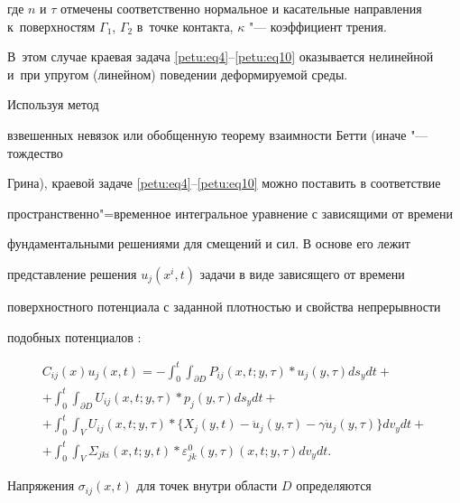 где $n$ и $\tau $ отмечены соответственно нормальное и касательные направления к~поверхностям $\Gamma _1$, $\Gamma _2$ в~точке контакта, $\kappa$ "--- коэффициент трения. 

В~этом случае краевая задача \eqref{petu:eq4}--\eqref{petu:eq10} оказывается нелинейной и~при упругом (линейном) поведении деформируемой среды.







 Используя метод

взвешенных невязок или обобщенную теорему взаимности Бетти (иначе "--- тождество

Грина), краевой задаче \eqref{petu:eq4}--\eqref{petu:eq10} можно поставить в соответствие

пространственно"=временное интегральное уравнение с зависящими от времени

фундаментальными решениями для смещений и сил. В основе его лежит

представление решения $u_j (x^i,t)$ задачи в виде зависящего от времени

поверхностного потенциала с заданной плотностью и свойства непрерывности

подобных потенциалов \cite{petu:bib3,petu:bib5,petu:bib10}:

\begin{multline}

\label{petu:eq12}

C_{ij} (x)u_j (x,t)=-\int _0^t \int _{\partial D} P_{ij}

(x,t;y,\tau ) \ast u_j (y,\tau )ds_y dt+\\

+\int _0^t \int _{\partial D} U_{ij} (x,t;y,\tau ) \ast p_j (y,\tau )ds_y

dt + \\

 +\int _0^t \int _V U_{ij} (x,t;y,\tau ) \ast \bigl\{X_j

(y,t)-\ddot {u}_j (y,\tau )-\gamma \dot {u}_j (y,\tau )\bigr\}dv_y dt + \\

 +\int _0^t \int _V \Sigma _{jki} (x,t;y,t)\ast \varepsilon

_{jk}^0 (y,\tau )(x,t;y,\tau ) dv_y dt.

\end{multline}

Напряжения $\sigma _{ij} (x,t)$ для точек внутри области $D$ определяются


